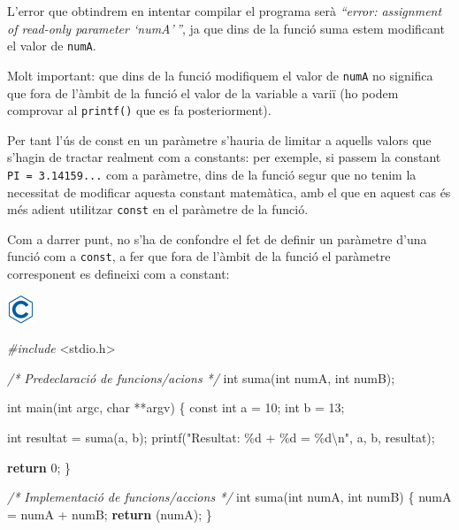 \documentclass[
]{book}
\newenvironment{Shaded}{\begin{snugshade}}{\end{snugshade}}
\newcommand{\CommentTok}[1]{\textcolor[rgb]{0.56,0.35,0.01}{\textit{#1}}}
\newcommand{\ControlFlowTok}[1]{\textcolor[rgb]{0.13,0.29,0.53}{\textbf{#1}}}
\newcommand{\DataTypeTok}[1]{\textcolor[rgb]{0.13,0.29,0.53}{#1}}
\newcommand{\DecValTok}[1]{\textcolor[rgb]{0.00,0.00,0.81}{#1}}
\newcommand{\ImportTok}[1]{#1}
\newcommand{\NormalTok}[1]{#1}
\newcommand{\PreprocessorTok}[1]{\textcolor[rgb]{0.56,0.35,0.01}{\textit{#1}}}
\newcommand{\SpecialCharTok}[1]{\textcolor[rgb]{0.00,0.00,0.00}{#1}}
\newcommand{\StringTok}[1]{\textcolor[rgb]{0.31,0.60,0.02}{#1}}
\begin{document}
L'error que obtindrem en intentar compilar el programa serà \emph{``error: assignment of read-only parameter `numA'\,''}, ja que dins de la funció suma estem modificant el valor de \texttt{numA}.

Molt important: que dins de la funció modifiquem el valor de \texttt{numA} no significa que fora de l'àmbit de la funció el valor de la variable a variï (ho podem comprovar al \texttt{printf()} que es fa posteriorment).

Per tant l'ús de const en un paràmetre s'hauria de limitar a aquells valors que s'hagin de tractar realment com a constants: per exemple, si passem la constant \texttt{PI\ =\ 3.14159...} com a paràmetre, dins de la funció segur que no tenim la necessitat de modificar aquesta constant matemàtica, amb el que en aquest cas és més adient utilitzar \texttt{const} en el paràmetre de la funció.

Com a darrer punt, no s'ha de confondre el fet de definir un paràmetre d'una funció com a \texttt{const}, a fer que fora de l'àmbit de la funció el paràmetre corresponent es defineixi com a constant:

\includegraphics{./img/c.png}

\begin{Shaded}
\begin{Highlighting}[]
\PreprocessorTok{\#include }\ImportTok{\textless{}stdio.h\textgreater{}}

\CommentTok{/* Predeclaració de funcions/acions */}
\DataTypeTok{int}\NormalTok{ suma(}\DataTypeTok{int}\NormalTok{ numA, }\DataTypeTok{int}\NormalTok{ numB);}

\DataTypeTok{int}\NormalTok{ main(}\DataTypeTok{int}\NormalTok{ argc, }\DataTypeTok{char}\NormalTok{ **argv) \{}
    \DataTypeTok{const} \DataTypeTok{int}\NormalTok{ a = }\DecValTok{10}\NormalTok{;}
    \DataTypeTok{int}\NormalTok{ b = }\DecValTok{13}\NormalTok{;}

    \DataTypeTok{int}\NormalTok{ resultat = suma(a, b);}
\NormalTok{    printf(}\StringTok{"Resultat: \%d + \%d = \%d}\SpecialCharTok{\textbackslash{}n}\StringTok{"}\NormalTok{, a, b, resultat);}

    \ControlFlowTok{return} \DecValTok{0}\NormalTok{;}
\NormalTok{\}}

\CommentTok{/* Implementació de funcions/accions */}
\DataTypeTok{int}\NormalTok{ suma(}\DataTypeTok{int}\NormalTok{ numA, }\DataTypeTok{int}\NormalTok{ numB) \{}
\NormalTok{    numA = numA + numB;}
    \ControlFlowTok{return}\NormalTok{ (numA);}
\NormalTok{\}}
\end{Highlighting}
\end{Shaded}
\end{document}
